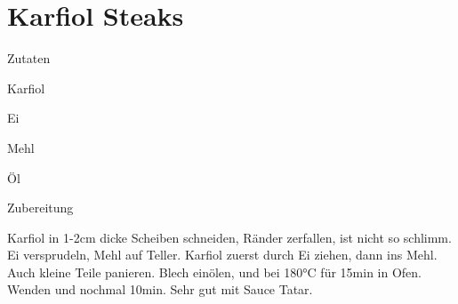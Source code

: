 \chapter*{Karfiol Steaks}
\begin{multicols}{2}
 {\Large Zutaten}
 \begin{Zutaten}
		\item Karfiol
		\item Ei
		\item Mehl
		\item Öl
		
			
				
\end{Zutaten}
	
\columnbreak
{}
\end{multicols}

{\Large Zubereitung} \newline
\begin{addmargin}[1cm]{0cm}
	Karfiol in 1-2cm dicke Scheiben schneiden, Ränder zerfallen, ist nicht so schlimm. \newline
	Ei versprudeln, Mehl auf Teller. \newline
	Karfiol zuerst durch Ei ziehen, dann ins Mehl. Auch kleine Teile panieren. \newline
	Blech einölen, und bei 180°C für 15min in Ofen. \newline
	Wenden und nochmal 10min. \newline
	Sehr gut mit Sauce Tatar.
	
	
\end{addmargin}

